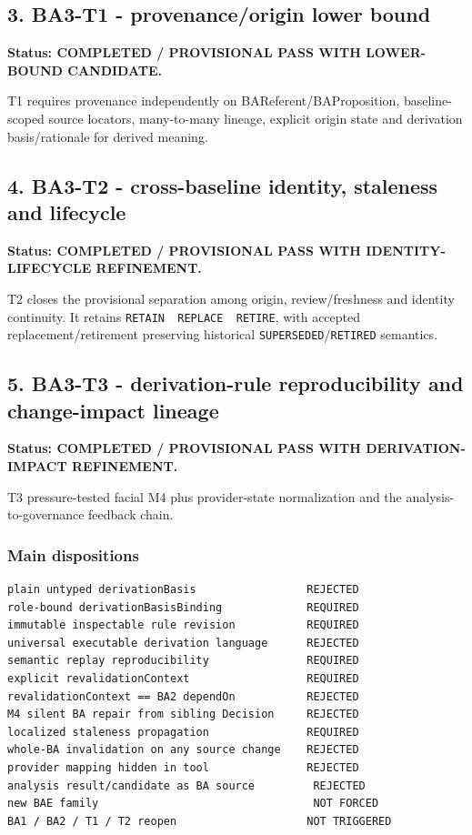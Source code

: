 \documentclass[11pt,a4paper]{article}
\begin{document}
\subsection{3. BA3-T1 - provenance/origin lower
bound}\label{ba3-t1---provenanceorigin-lower-bound}

\textbf{Status: COMPLETED / PROVISIONAL PASS WITH LOWER-BOUND
CANDIDATE.}

T1 requires provenance independently on BAReferent/BAProposition,
baseline-scoped source locators, many-to-many lineage, explicit origin
state and derivation basis/rationale for derived meaning.

\subsection{4. BA3-T2 - cross-baseline identity, staleness and
lifecycle}\label{ba3-t2---cross-baseline-identity-staleness-and-lifecycle}

\textbf{Status: COMPLETED / PROVISIONAL PASS WITH IDENTITY-LIFECYCLE
REFINEMENT.}

T2 closes the provisional separation among origin, review/freshness and
identity continuity. It retains
\texttt{RETAIN\ \textbar{}\ REPLACE\ \textbar{}\ RETIRE}, with accepted
replacement/retirement preserving historical
\texttt{SUPERSEDED}/\texttt{RETIRED} semantics.

\subsection{5. BA3-T3 - derivation-rule reproducibility and
change-impact
lineage}\label{ba3-t3---derivation-rule-reproducibility-and-change-impact-lineage}

\textbf{Status: COMPLETED / PROVISIONAL PASS WITH DERIVATION-IMPACT
REFINEMENT.}

T3 pressure-tested facial M4 plus provider-state normalization and the
analysis-to-governance feedback chain.

\subsubsection{Main dispositions}\label{main-dispositions}

\begin{verbatim}
plain untyped derivationBasis                 REJECTED
role-bound derivationBasisBinding             REQUIRED
immutable inspectable rule revision           REQUIRED
universal executable derivation language      REJECTED
semantic replay reproducibility               REQUIRED
explicit revalidationContext                  REQUIRED
revalidationContext == BA2 dependOn           REJECTED
M4 silent BA repair from sibling Decision     REJECTED
localized staleness propagation               REQUIRED
whole-BA invalidation on any source change    REJECTED
provider mapping hidden in tool               REJECTED
analysis result/candidate as BA source         REJECTED
new BAE family                                 NOT FORCED
BA1 / BA2 / T1 / T2 reopen                    NOT TRIGGERED
\end{verbatim}
\end{document}
